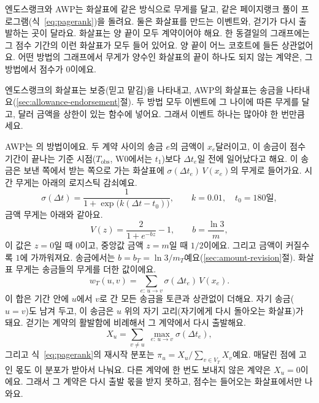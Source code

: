 엔도스랭크와 AWP는 화살표에 같은 방식으로 무게를 달고, 같은 페이지랭크 풀이 프로그램(식~\eqref{eq:pagerank})을 돌려요. 둘은 화살표를 만드는 이벤트와, 걷기가 다시 출발하는 곳이 달라요. 화살표는 양 끝이 모두 계약이어야 해요. 한 동결일의 그래프에는 그 점수 기간의 이런 화살표가 모두 들어 있어요. 양 끝이 어느 코호트에 들든 상관없어요. 어떤 방법의 그래프에서 무게가 양수인 화살표의 끝이 하나도 되지 않는 계약은, 그 방법에서 점수가 $0$이에요.

엔도스랭크의 화살표는 보증(믿고 맡김)을 나타내고, AWP의 화살표는 송금을 나타내요(\ref{sec:allowance-endorsement}절). 두 방법 모두 이벤트에 그 나이에 따른 무게를 달고, 달러 금액을 상한이 있는 함수에 넣어요. 그래서 이벤트 하나는 많아야 한 번만큼 세요.


AWP는 \textcite{do2023awp}의 방법이에요. 두 계약 사이의 송금 $e$의 금액이 $x_e$달러이고, 이 송금이 점수 기간이 끝나는 기준 시점($T_{\mathrm{obs}}$, W0에서는 $t_1$)보다 $\Delta t_e$일 전에 일어났다고 해요. 이 송금은 보낸 쪽에서 받는 쪽으로 가는 화살표에 $\sigma(\Delta t_e)\,V(x_e)$의 무게로 들어가요. 시간 무게는 아래의 로지스틱 감쇠예요.
\begin{equation}
\label{eq:logistic-decay}
\sigma(\Delta t)
=
\frac{1}{1+\exp\bigl(k(\Delta t-t_0)\bigr)},
\qquad
k=0.01,\quad t_0=180\text{일},
\end{equation}
금액 무게는 아래와 같아요.
\begin{equation}
\label{eq:value-transform}
V(z)
=
\frac{2}{1+e^{-bz}}-1,
\qquad
b=\frac{\ln 3}{m},
\end{equation}
이 값은 $z=0$일 때 $0$이고, 중앙값 금액 $z=m$일 때 $1/2$이에요. 그리고 금액이 커질수록 $1$에 가까워져요. 송금에서는 $b=b_T=\ln 3/m_T$예요(\ref{sec:amount-revision}절). 화살표 무게는 송금들의 무게를 더한 값이에요.
\begin{equation}
\label{eq:transfer-weight}
w_T(u,v)
=
\sum_{e:\,u\to v}
\sigma(\Delta t_e)\,V(x_e).
\end{equation}
이 합은 기간 안에 $u$에서 $v$로 간 모든 송금을 토큰과 상관없이 더해요. 자기 송금($u=v$)도 남겨 두고, 이 송금은 $u$ 위의 자기 고리(자기에게 다시 돌아오는 화살표)가 돼요. 걷기는 계약의 활발함에 비례해서 그 계약에서 다시 출발해요.
\begin{equation}
\label{eq:activeness}
X_u
=
\sum_{v\neq u}\;
\max_{e:\,u\to v}\sigma(\Delta t_e),
\end{equation}
그리고 식~\eqref{eq:pagerank}의 재시작 분포는 $\pi_u=X_u/\sum_{v\in V_T}X_v$예요. 매달린 점에 고인 몫도 이 분포가 받아서 나눠요. 다른 계약에 한 번도 보내지 않은 계약은 $X_u=0$이에요. 그래서 그 계약은 다시 출발 몫을 받지 못하고, 점수는 들어오는 화살표에서만 나와요.

